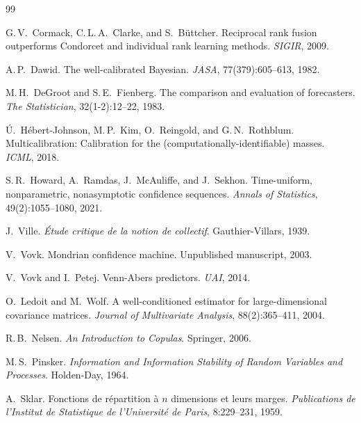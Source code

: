 \documentclass[11pt]{article}
\theoremstyle{definition}
\theoremstyle{remark}
\begin{document}

\begin{thebibliography}{99}

G.\,V.~Cormack, C.\,L.\,A.~Clarke, and S.~B\"uttcher. Reciprocal rank
fusion outperforms Condorcet and individual rank learning methods.
\emph{SIGIR}, 2009.

A.\,P.~Dawid. The well-calibrated Bayesian. \emph{JASA}, 77(379):605--613, 1982.

M.\,H.~DeGroot and S.\,E.~Fienberg. The comparison and evaluation of
forecasters. \emph{The Statistician}, 32(1-2):12--22, 1983.

\'U.~H\'ebert-Johnson, M.\,P.~Kim, O.~Reingold, and G.\,N.~Rothblum.
Multicalibration: Calibration for the (computationally-identifiable)
masses. \emph{ICML}, 2018.

S.\,R.~Howard, A.~Ramdas, J.~McAuliffe, and J.~Sekhon. Time-uniform,
nonparametric, nonasymptotic confidence sequences. \emph{Annals of
Statistics}, 49(2):1055--1080, 2021.

J.~Ville. \emph{\'Etude critique de la notion de collectif}.
Gauthier-Villars, 1939.

V.~Vovk. Mondrian confidence machine. Unpublished manuscript, 2003.

V.~Vovk and I.~Petej. Venn-Abers predictors. \emph{UAI}, 2014.

O.~Ledoit and M.~Wolf. A well-conditioned estimator for
large-dimensional covariance matrices. \emph{Journal of Multivariate
Analysis}, 88(2):365--411, 2004.

R.\,B.~Nelsen. \emph{An Introduction to Copulas}. Springer, 2006.

M.\,S.~Pinsker. \emph{Information and Information Stability of Random
Variables and Processes}. Holden-Day, 1964.

A.~Sklar. Fonctions de r\'epartition \`a $n$ dimensions et leurs
marges. \emph{Publications de l'Institut de Statistique de l'Universit\'e
de Paris}, 8:229--231, 1959.


\end{thebibliography}
\end{document}
